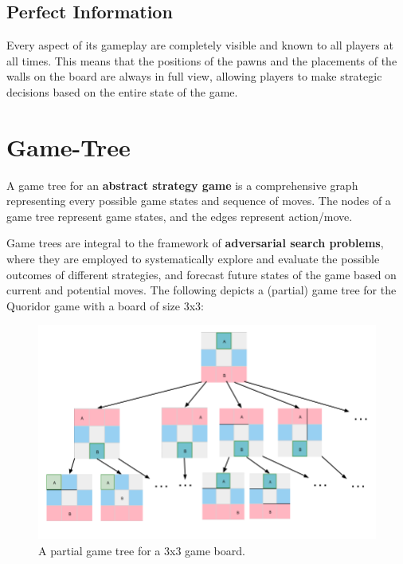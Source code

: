 \subsection{Perfect Information}
Every aspect of its gameplay are completely visible and known to all players at all times. This means
that the positions of the pawns and the placements of the walls on the board are always in full view,
allowing players to make strategic decisions based on the entire state of the game.

\newpage

\section{Game-Tree}

A game tree for an \textbf{abstract strategy game} is a comprehensive graph representing every possible game states and sequence of moves. The nodes of a game tree represent game states, and the
edges represent action/move.

Game trees are integral to the framework of \textbf{adversarial search problems}, where they are employed to systematically explore and evaluate the possible outcomes of different strategies, and forecast future states of the game based on current and potential moves.
\newline
\newline
The following depicts a (partial) game tree for the Quoridor game with a board of size 3x3:

\begin{figure}[h]
    \centering
    \includegraphics[scale=0.45]{../img/GameBoard/game_tree.png}
    \caption{A partial game tree for a 3x3 game board.}
    \label{fig:GameTree}
\end{figure}

